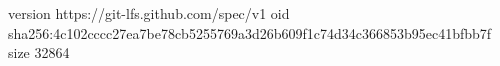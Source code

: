 version https://git-lfs.github.com/spec/v1
oid sha256:4c102cccc27ea7be78cb5255769a3d26b609f1c74d34c366853b95ec41bfbb7f
size 32864
